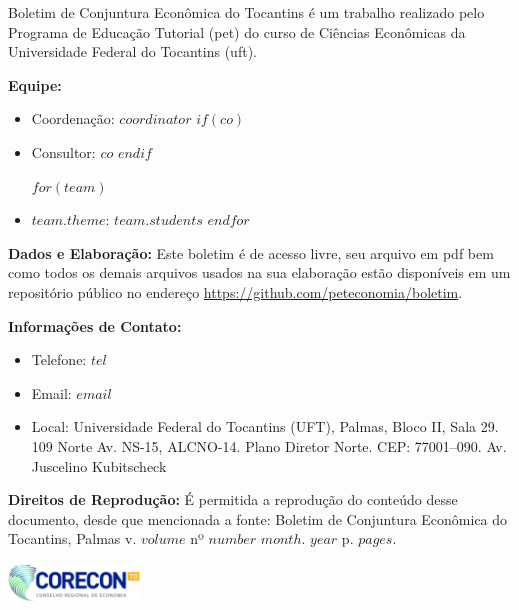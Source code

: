\documentclass[twocolumn, a4paper, 10pt]{report}
\newcommand{\abbr}[1]{\acrshort{#1}}
\begin{document}
    \newpage\null\thispagestyle{empty}\newpage\clearpage
    

    \begin{tcolorbox}[colback=boxbackground, colframe=boxbackground, arc=0mm, top=15pt]
        Boletim de Conjuntura Econômica do Tocantins é um trabalho realizado pelo Programa de Educação Tutorial (\abbr{pet}) do curso de Ciências Econômicas da Universidade Federal do Tocantins (\abbr{uft}).
        \\
        \par{\bf Equipe:}
        \begin{itemize}
        \item{Coordenação:} $coordinator$
        $if(co)$\item{Consultor:} $co$ $endif$
        
        $for(team)$
        \item{$team.theme$:} $team.students$
        $endfor$
        \end{itemize}
        \par{\bf Dados e Elaboração:}
            Este boletim é de acesso livre, seu arquivo em pdf bem como todos os demais arquivos usados na sua elaboração estão disponíveis em um repositório público no endereço \href{https://github.com/peteconomia/boletim}{https://github.com/peteconomia/boletim}.
        \\
        \par{\bf Informações de Contato:}
        \begin{itemize}
            \item{Telefone:} $tel$
            \item{Email:} $email$
            \item{Local:} Universidade Federal do Tocantins (UFT), Palmas, Bloco II, Sala 29. 109 Norte Av. NS-15, ALCNO-14. Plano Diretor Norte. CEP: 77001--090. Av. Juscelino Kubitscheck
        \end{itemize}
        \par{\bf Direitos de Reprodução:}
        É permitida a reprodução do conteúdo desse documento, desde que mencionada a fonte: Boletim de Conjuntura Econômica do Tocantins, Palmas v. $volume$ nº $number$ $month$. $year$ p. $pages$.
    \end{tcolorbox}
    
    \vspace{\fill}
    \begin{center}
        \includegraphics[width=3.5cm]{images/corecon.png}
    \end{center}
\end{document}
